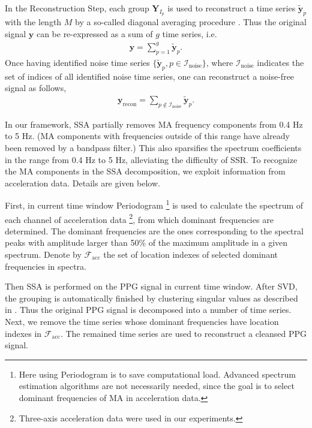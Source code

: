 \documentclass[10pt,twocolumn]{IEEEtran}
\begin{document}
In the Reconstruction Step, each group $\mathbf{Y}_{I_p}$ is used to reconstruct a time series $\widetilde{\mathbf{y}}_p$ with the length $M$ by a so-called diagonal averaging procedure \cite{golyandina2001SSA}. Thus the original signal $\mathbf{y}$ can be re-expressed as a sum of $g$ time series, i.e.
\begin{eqnarray}
\mathbf{y} = \sum_{p=1}^g \widetilde{\mathbf{y}}_p.
\end{eqnarray}
Once having identified noise time series $\{ \widetilde{\mathbf{y}}_p, p\in \mathcal{I}_{\mathrm{noise}} \}$, where $\mathcal{I}_{\mathrm{noise}}$ indicates the set of indices of all identified noise time series, one can reconstruct a noise-free signal as follows,
\begin{eqnarray}
\mathbf{y}_{\mathrm{recon}} = \sum_{p \not \in \mathcal{I}_{\mathrm{noise}}} \widetilde{\mathbf{y}}_p.
\end{eqnarray}



In our framework, SSA partially removes MA frequency components from 0.4 Hz to 5 Hz. (MA components with frequencies outside of this range have already been removed by a bandpass filter.) This also sparsifies the spectrum coefficients in the range from 0.4 Hz to 5 Hz, alleviating the difficulty of SSR. To recognize the MA components in the SSA decomposition, we exploit information from acceleration data. Details are given below.


First, in current time window Periodogram \footnote{Here using Periodogram is to save computational load. Advanced spectrum estimation algorithms are not necessarily needed, since the goal is to select dominant frequencies of MA in acceleration data.} is used to calculate the spectrum of each channel of acceleration data \footnote{Three-axis acceleration data were used in our experiments.}, from which dominant frequencies are determined. The dominant frequencies are the ones corresponding to the spectral peaks with amplitude larger than 50\% of the maximum amplitude in a given spectrum. Denote by $\mathcal{F}_{\mathrm{acc}}$ the set of location indexes of selected dominant frequencies in spectra.

Then SSA is performed on the PPG signal in current time window. After SVD, the grouping is automatically finished by clustering singular values as described in \cite[pp. 66]{golyandina2001SSA}. Thus the original PPG signal is decomposed into a number of time series. Next, we remove the time series whose  dominant frequencies have  location indexes in $\mathcal{F}_{\mathrm{acc}}$. The remained time series are used to reconstruct a cleansed PPG signal.
\end{document}
